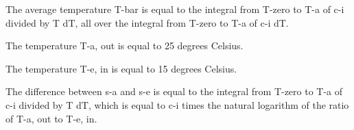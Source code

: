 The average temperature T-bar is equal to the integral from T-zero to T-a of c-i divided by T dT, all over the integral from T-zero to T-a of c-i dT.

The temperature T-a, out is equal to 25 degrees Celsius.

The temperature T-e, in is equal to 15 degrees Celsius.

The difference between s-a and s-e is equal to the integral from T-zero to T-a of c-i divided by T dT, which is equal to c-i times the natural logarithm of the ratio of T-a, out to T-e, in.